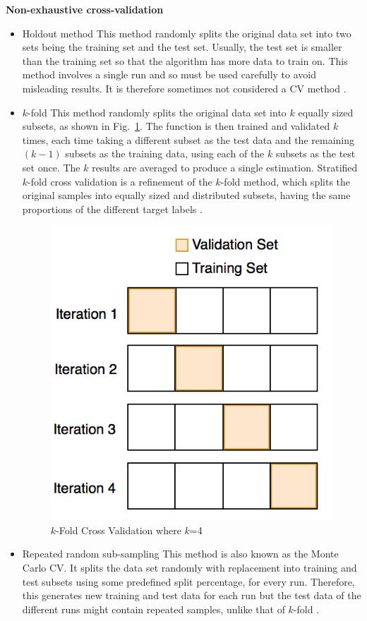 \break\noindent\textbf{Non-exhaustive cross-validation}
\begin{itemize}
\item Holdout method \newline {}
This method randomly splits the original data set into two sets being the training set and the test set. Usually, the test set is smaller than the training set so that the algorithm has more data to train on. This method involves a single run and so must be used carefully to avoid misleading results. It is therefore sometimes not considered a CV method \cite{kohavi1995study}.

\item $k$-fold\newline {}
This method randomly splits the original data set into $k$ equally sized subsets, as shown in Fig.~\ref{fig:kfold}. The function is then trained and validated $k$ times, each time taking a different subset as the test data and the remaining $(k-1)$ subsets as the training data, using each of the $k$ subsets as the test set once. The $k$ results are averaged to produce a single estimation. Stratified $k$-fold cross validation is a refinement of the $k$-fold method, which splits the original samples into equally sized and distributed subsets, having the same proportions of the different target labels \cite{kohavi1995study}.

\begin{figure}
\centering
  \includegraphics[width=0.5\linewidth]{kfold.png}
  \caption{$k$-Fold Cross Validation where $k$=4}
  \label{fig:kfold}
\end{figure}

\item Repeated random sub-sampling\newline {}
This method is also known as the Monte Carlo CV. It splits the data set randomly with replacement into training and test subsets using some predefined split percentage, for every run. Therefore, this generates new training and test data for each run but the test data of the different runs might contain repeated samples, unlike that of $k$-fold \cite{xu2001monte}.
\end{itemize}

